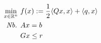 \begin{definition}
\begin{align}
  \min_{x \in \mathbb{R}^n}\ & f(x)
    := \frac{1}{2} \langle Qx,x \rangle + \langle q,x \rangle \\
  \text{\em Nb. } & Ax = b \notag \\
      & Gx \leq r \notag
\end{align}
\end{definition}